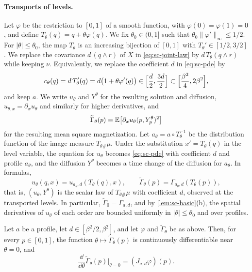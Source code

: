 \paragraph{Transports of levels.}
Let $\varphi$ be the restriction to $[0,1]$ of a smooth function, with
$\varphi(0)=\varphi(1)=0$, and define $T_\theta(q)=q+\theta\varphi(q)$.
We fix $\theta_0\in(0,1]$ such that $\theta_0\|\varphi'\|_\infty\le1/2$.
For $|\theta|\le\theta_0$, the map $T_\theta$ is an
increasing bijection of $[0,1]$ with $T_\theta'\in[1/2,3/2]$. We replace
the covariance $d\,(q\wedge r)$ of $X$ in \eqref{eq:sc-joint-law} by
$d\,T_\theta(q\wedge r)$ while keeping $\nu$. Equivalently, we replace
the coefficient $d$ in \eqref{eq:sc-pde} by
\[
 c_\theta(q)=d\,T_\theta'(q)=d\bigl(1+\theta\varphi'(q)\bigr)
 \in\Bigl[\frac d2,\frac{3d}2\Bigr]\subset\Bigl[\frac{\beta^2}4,2\beta^2\Bigr],
\]
and keep $a$. We write $u_\theta$ and $Y^\theta$ for the resulting
solution and diffusion, $u_{\theta,x}=\partial_xu_\theta$ and similarly
for higher derivatives, and
\[
 \widetilde\Gamma_\theta(p)=\mathbb E\bigl[\partial_xu_\theta(p,Y^\theta_p)^2\bigr]
\]
for the resulting mean square magnetization. Let
$a_\theta=a\circ T_\theta^{-1}$ be the distribution function of the
image measure $T_{\theta\#}\mu$. Under the substitution $x'=T_\theta(q)$
in the level variable, the equation for $u_\theta$ becomes
\eqref{eq:sc-pde} with coefficient $d$ and profile $a_\theta$, and the
diffusion $Y^\theta$ becomes a time change of the diffusion for
$a_\theta$. In formulas,
\begin{equation}\label{eq:sc-transported}
 u_\theta(q,x)=u_{a_\theta,d}(T_\theta(q),x),\qquad
 \widetilde\Gamma_\theta(p)=\Gamma_{a_\theta,d}(T_\theta(p)),
\end{equation}
that is, $(u_\theta,Y^\theta)$ is the scalar law of $T_{\theta\#}\mu$
with coefficient $d$, observed at the transported levels. In
particular, $\widetilde\Gamma_0=\Gamma_{a,d}$, and by
\cref{lem:sc-basic}(b), the spatial derivatives of $u_\theta$ of each
order are bounded uniformly in $|\theta|\le\theta_0$ and over profiles.

\begin{lemma}\label{lem:sc-response}
Let $a$ be a profile, let $d\in[\beta^2/2,\beta^2]$, and let $\varphi$
and $\widetilde\Gamma_\theta$ be as above. Then, for every $p\in[0,1]$,
the function $\theta\mapsto\widetilde\Gamma_\theta(p)$ is continuously
differentiable near $\theta=0$, and
\[
 \frac{\dd}{\dd\theta}\widetilde\Gamma_\theta(p)\Big|_{\theta=0}
 =(J_{a,d}\varphi)(p).
\]
\end{lemma}

